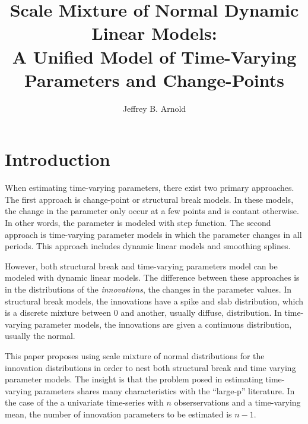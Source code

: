 \documentclass{article}
\author{Jeffrey B. Arnold}
\title{Scale Mixture of Normal Dynamic Linear Models: \\
  A Unified Model of Time-Varying Parameters and Change-Points}
\begin{document}
\maketitle{}

\section{Introduction}
\label{sec:introduction}

When estimating time-varying parameters, there exist two primary approaches.
The first approach is change-point or structural break models. 
In these models, the change in the parameter only occur at a few points and is contant otherwise.
In other words, the parameter is modeled with step function.
The second approach is time-varying parameter models in which the parameter changes in all periods.
This approach includes dynamic linear models and smoothing splines.

However, both structural break and time-varying parameters model can be modeled with dynamic linear models.
The difference between these approaches is in the distributions of the \textit{innovations}, the changes in the parameter values.
In structural break models, the innovations have a spike and slab distribution, which is a discrete mixture between 0 and another, usually diffuse, distribution.
In time-varying parameter models, the innovations are given a continuous distribution, usually the normal.

This paper proposes using scale mixture of normal distributions for the innovation distributions in order to nest both structural break and time varying parameter models.
The insight is that the problem posed in estimating time-varying parameters shares many characteristics with the ``large-p'' literature.
In the case of the a univariate time-series with $n$ obserservations and a time-varying mean, the number of innovation parameters to be estimated is $n - 1$.
\end{document}
